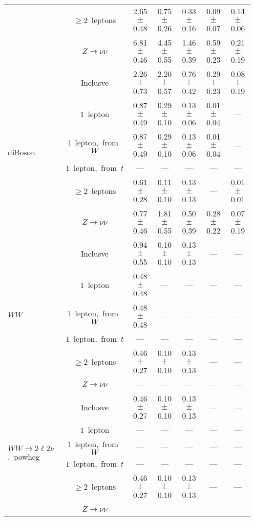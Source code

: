 \documentclass{article}
\begin{document}
\begin{longtable}{|l|c|c|c|c|c|c|}
 & $\ge2$~leptons  & 2.65 $\pm$ 0.48  & 0.75 $\pm$ 0.26  & 0.33 $\pm$ 0.16  & 0.09 $\pm$ 0.07  & 0.14 $\pm$ 0.06 \\* 
 & $Z\rightarrow\nu\nu$  & 6.81 $\pm$ 0.46  & 4.45 $\pm$ 0.55  & 1.46 $\pm$ 0.39  & 0.59 $\pm$ 0.23  & 0.21 $\pm$ 0.19 \\* 
\hline 
\multirow{6}{*}{diBoson} & Inclusve  & 2.26 $\pm$ 0.73  & 2.20 $\pm$ 0.57  & 0.76 $\pm$ 0.42  & 0.29 $\pm$ 0.23  & 0.08 $\pm$ 0.19 \\* 
 & $1$~lepton  & 0.87 $\pm$ 0.49  & 0.29 $\pm$ 0.10  & 0.13 $\pm$ 0.06  & 0.01 $\pm$ 0.04  & --- \\* 
 & $1$~lepton,~from~$W$  & 0.87 $\pm$ 0.49  & 0.29 $\pm$ 0.10  & 0.13 $\pm$ 0.06  & 0.01 $\pm$ 0.04  & --- \\* 
 & $1$~lepton,~from~$t$  & ---  & ---  & ---  & ---  & --- \\* 
 & $\ge2$~leptons  & 0.61 $\pm$ 0.28  & 0.11 $\pm$ 0.10  & 0.13 $\pm$ 0.13  & ---  & 0.01 $\pm$ 0.01 \\* 
 & $Z\rightarrow\nu\nu$  & 0.77 $\pm$ 0.46  & 1.81 $\pm$ 0.55  & 0.50 $\pm$ 0.39  & 0.28 $\pm$ 0.22  & 0.07 $\pm$ 0.19 \\* 
\hline 
\multirow{6}{*}{$WW$} & Inclusve  & 0.94 $\pm$ 0.55  & 0.10 $\pm$ 0.10  & 0.13 $\pm$ 0.13  & ---  & --- \\* 
 & $1$~lepton  & 0.48 $\pm$ 0.48  & ---  & ---  & ---  & --- \\* 
 & $1$~lepton,~from~$W$  & 0.48 $\pm$ 0.48  & ---  & ---  & ---  & --- \\* 
 & $1$~lepton,~from~$t$  & ---  & ---  & ---  & ---  & --- \\* 
 & $\ge2$~leptons  & 0.46 $\pm$ 0.27  & 0.10 $\pm$ 0.10  & 0.13 $\pm$ 0.13  & ---  & --- \\* 
 & $Z\rightarrow\nu\nu$  & ---  & ---  & ---  & ---  & --- \\* 
\hline 
\multirow{6}{*}{$WW{\rightarrow}2\ell2\nu$,~powheg} & Inclusve  & 0.46 $\pm$ 0.27  & 0.10 $\pm$ 0.10  & 0.13 $\pm$ 0.13  & ---  & --- \\* 
 & $1$~lepton  & ---  & ---  & ---  & ---  & --- \\* 
 & $1$~lepton,~from~$W$  & ---  & ---  & ---  & ---  & --- \\* 
 & $1$~lepton,~from~$t$  & ---  & ---  & ---  & ---  & --- \\* 
 & $\ge2$~leptons  & 0.46 $\pm$ 0.27  & 0.10 $\pm$ 0.10  & 0.13 $\pm$ 0.13  & ---  & --- \\* 
 & $Z\rightarrow\nu\nu$  & ---  & ---  & ---  & ---  & --- \\* 

\end{longtable}
\end{document}
